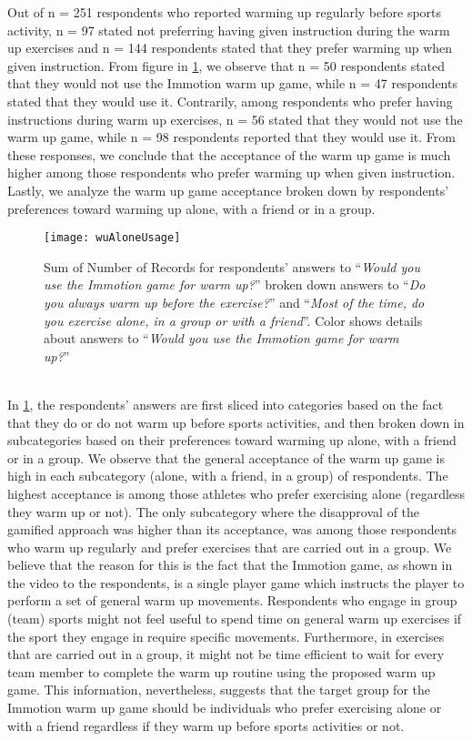 Out of n = 251 respondents who reported warming up regularly before sports activity, n = 97 stated not preferring having given instruction during the warm up exercises and n = 144 respondents stated that they prefer warming up when given instruction. From figure in \ref{fig:wuAloneUsage}, we observe that n = 50 respondents stated that they would not use the Immotion warm up game, while n = 47 respondents stated that they would use it. Contrarily, among respondents who prefer having instructions during warm up exercises, n = 56 stated that they would not use the warm up game, while n = 98 respondents reported that they would use it. From these responses, we conclude that the acceptance of the warm up game is much higher among those respondents who prefer warming up when given instruction. Lastly, we analyze the warm up game acceptance broken down by respondents' preferences toward warming up alone, with a friend or in a group.
\begin{figure}[h]
    \centering
    \texttt{[image: wuAloneUsage]}
    \caption{Sum of Number of Records for respondents' answers to ``\textit{Would you use the Immotion game for warm up?}'' broken down answers to ``\textit{Do you always warm up before the exercise?}'' and ``\textit{Most of the time, do you exercise alone, in a group or with a friend}''. Color shows details about answers to ``\textit{Would you use the Immotion game for warm up?}''}
    \label{fig:wuAloneUsage}
\end{figure}\\
In \ref{fig:wuAloneUsage}, the respondents' answers are first sliced into categories based on the fact that they do or do not warm up before sports activities, and then broken down in subcategories based on their preferences toward warming up alone, with a friend or in a group. We observe that the general acceptance of the warm up game is high in each subcategory (alone, with a friend, in a group) of respondents. The highest acceptance is among those athletes who prefer exercising alone (regardless they warm up or not). The only subcategory where the disapproval of the gamified approach was higher than its acceptance, was among those respondents who warm up regularly and prefer exercises that are carried out in a group. We believe that the reason for this is the fact that the Immotion game, as shown in the video to the respondents, is a single player game which instructs the player to perform a set of general warm up movements. Respondents who engage in group (team) sports might not feel useful to spend time on general warm up exercises if the sport they engage in require specific movements. Furthermore, in exercises that are carried out in a group, it might not be time efficient to wait for every team member to complete the warm up routine using the proposed warm up game. This information, nevertheless, suggests that the target group for the Immotion warm up game should be individuals who prefer exercising alone or with a friend regardless if they warm up before sports activities or not.\\
